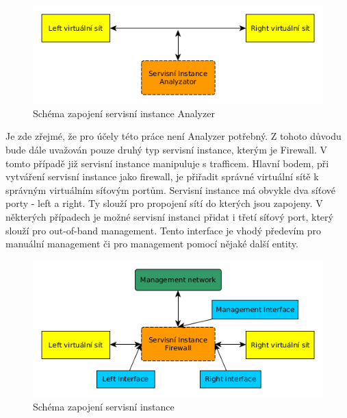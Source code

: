 \begin{figure}[h]
\begin{centering}
\includegraphics[scale=0.63]{images/service_instance_anal}
\par\end{centering}
\caption{Schéma zapojení servisní instance Analyzer\label{fig:service_instance_anal}}
\end{figure}

Je zde zřejmé, že pro účely této práce není Analyzer potřebný. Z tohoto důvodu bude dále uvažován pouze druhý typ servisní instance, kterým je Firewall. V tomto případě již servisní instance manipuluje s trafficem. Hlavní bodem, při vytváření servisní instance jako firewall, je přiřadit správné virtuální sítě k správným virtuálním síťovým portům. Servisní instance má obvykle dva síťové porty - left a right. Ty slouží pro propojení sítí do kterých jsou zapojeny. V některých případech je možné servisní instanci přidat i třetí síťový port, který slouží pro out-of-band management. Tento interface je vhodý předevím pro manuální management či pro management pomocí nějaké další entity.

\begin{figure}[h]
\begin{centering}
\includegraphics[scale=0.63]{images/service_instance}
\par\end{centering}
\caption{Schéma zapojení servisní instance\label{fig:service_instance}}
\end{figure}

